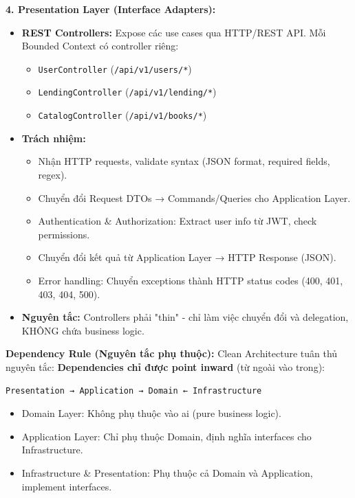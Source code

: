 \textbf{4. Presentation Layer (Interface Adapters):}
\begin{itemize}
    \item \textbf{REST Controllers:} Expose các use cases qua HTTP/REST API. Mỗi Bounded Context có controller riêng:
    \begin{itemize}
        \item \texttt{UserController} (\texttt{/api/v1/users/*})
        \item \texttt{LendingController} (\texttt{/api/v1/lending/*})
        \item \texttt{CatalogController} (\texttt{/api/v1/books/*})
    \end{itemize}
    
    \item \textbf{Trách nhiệm:}
    \begin{itemize}
        \item Nhận HTTP requests, validate syntax (JSON format, required fields, regex).
        \item Chuyển đổi Request DTOs → Commands/Queries cho Application Layer.
        \item Authentication \& Authorization: Extract user info từ JWT, check permissions.
        \item Chuyển đổi kết quả từ Application Layer → HTTP Response (JSON).
        \item Error handling: Chuyển exceptions thành HTTP status codes (400, 401, 403, 404, 500).
    \end{itemize}
    
    \item \textbf{Nguyên tắc:} Controllers phải "thin" - chỉ làm việc chuyển đổi và delegation, KHÔNG chứa business logic.
\end{itemize}

\textbf{Dependency Rule (Nguyên tắc phụ thuộc):}
Clean Architecture tuân thủ nguyên tắc: \textbf{Dependencies chỉ được point inward} (từ ngoài vào trong):

\begin{center}
\texttt{Presentation → Application → Domain ← Infrastructure}
\end{center}

\begin{itemize}
    \item Domain Layer: Không phụ thuộc vào ai (pure business logic).
    \item Application Layer: Chỉ phụ thuộc Domain, định nghĩa interfaces cho Infrastructure.
    \item Infrastructure \& Presentation: Phụ thuộc cả Domain và Application, implement interfaces.
\end{itemize}

